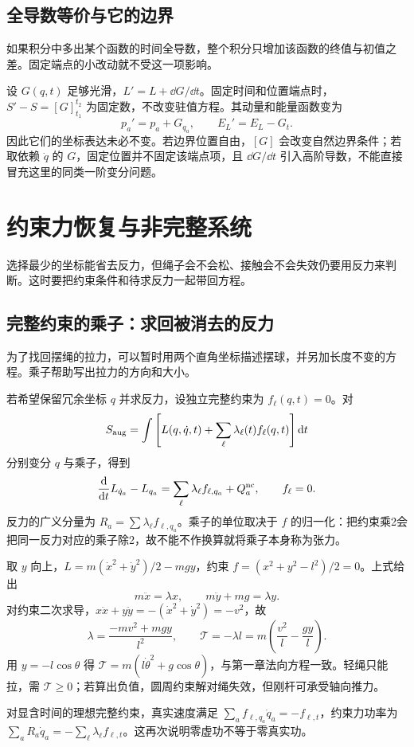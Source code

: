 \subsection{全导数等价与它的边界}
如果积分中多出某个函数的时间全导数，整个积分只增加该函数的终值与初值之差。固定端点的小改动就不受这一项影响。

设 $G(q,t)$ 足够光滑，$L'=L+\dd G/\dd t$。固定时间和位置端点时，$S'-S=[G]_{t_1}^{t_2}$ 为固定数，不改变驻值方程。其动量和能量函数变为
\[
p_a'=p_a+G_{q_a},\qquad E_L'=E_L-G_t.
\]
因此它们的坐标表达未必不变。若边界位置自由，$[G]$ 会改变自然边界条件；若取依赖 $\dot q$ 的 $G$，固定位置并不固定该端点项，且 $\dd G/\dd t$ 引入高阶导数，不能直接冒充这里的同类一阶变分问题。

\section{约束力恢复与非完整系统}
选择最少的坐标能省去反力，但绳子会不会松、接触会不会失效仍要用反力来判断。这时要把约束条件和待求反力一起带回方程。

\subsection{完整约束的乘子：求回被消去的反力}
为了找回摆绳的拉力，可以暂时用两个直角坐标描述摆球，并另加长度不变的方程。乘子帮助写出拉力的方向和大小。

若希望保留冗余坐标 $q$ 并求反力，设独立完整约束为 $f_\ell(q,t)=0$。对
\[
S_{\rm aug}=\int\left[L(q,\dot q,t)+\sum_\ell\lambda_\ell(t)f_\ell(q,t)\right]\mathrm{d} t
\]
分别变分 $q$ 与乘子，得到
\begin{equation}\label{eq:lag-holonomic-multipliers}
\frac{\mathrm{d}}{\mathrm{d} t}L_{\dot q_a}-L_{q_a}
=\sum_\ell\lambda_\ell f_{\ell,q_a}+Q_a^{\rm nc},\qquad f_\ell=0.
\end{equation}
反力的广义分量为 $R_a=\sum\lambda_\ell f_{\ell,q_a}$。乘子的单位取决于 $f$ 的归一化：把约束乘2会把同一反力对应的乘子除2，故不能不作换算就将乘子本身称为张力。

\begin{example}[用直角坐标恢复单摆张力]
取 $y$ 向上，$L=m(\dot x^2+\dot y^2)/2-mgy$，约束 $f=(x^2+y^2-l^2)/2=0$。上式给出
\[
m\ddot x=\lambda x,\qquad m\ddot y+mg=\lambda y.
\]
对约束二次求导，$x\ddot x+y\ddot y=-(\dot x^2+\dot y^2)=-v^2$，故
\[
\lambda=\frac{-mv^2+mgy}{l^2},\qquad
\mathcal T=-\lambda l=m\left(\frac{v^2}{l}-\frac{gy}{l}\right).
\]
用 $y=-l\cos\theta$ 得 $\mathcal T=m(l\dot\theta^2+g\cos\theta)$，与第一章法向方程一致。轻绳只能拉，需 $\mathcal T\ge0$；若算出负值，圆周约束解对绳失效，但刚杆可承受轴向推力。
\end{example}
对显含时间的理想完整约束，真实速度满足 $\sum_a f_{\ell,q_a}\dot q_a=-f_{\ell,t}$，约束力功率为 $\sum_aR_a\dot q_a=-\sum_\ell\lambda_\ell f_{\ell,t}$。这再次说明零虚功不等于零真实功。

